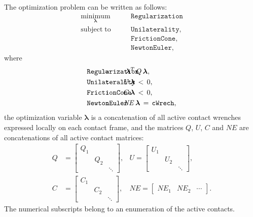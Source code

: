 \documentclass[12pt]{article}
\begin{document}
The optimization problem can be written as follows:
%
\begin{align}
    \underset{\bm{\lambda}}{\bm{\mathrm{minimum}}} &\qquad \texttt{Regularization}\\
    \bm{\mathrm{subject\;to}} &\qquad   \texttt{Unilaterality},      \nonumber\\
                  &\qquad  \texttt{FrictionCone},     \nonumber\\
                  & \qquad \texttt{NewtonEuler}, \nonumber
\end{align}
%
where
%
\begin{align}
    &\texttt{Regularization}& &\hspace{-20mm}\!\!\!=  \qquad\bm{\lambda}^T \,Q \,\bm{\lambda}, \\
    &\texttt{Unilaterality}& &\hspace{-20mm}\texttt{:}\qquad U\,\bm{\lambda} \,<\, 0, \\
    &\texttt{FrictionCone}& &\hspace{-20mm}\texttt{:}\qquad C\,\bm{\lambda} \,<\, 0, \\
    &\texttt{NewtonEuler} & &\hspace{-20mm}\texttt{:}\qquad \mathit{NE} \,\bm{\lambda} \,=\, \texttt{cWrech},
\end{align}
%
the optimization variable $\bm{\lambda}$ is a concatenation of all active contact wrenches expressed locally on each contact frame, and the matrices $Q$, $U$, $C$ and $\mathit{NE}$ are concatenations of all active contact matrices:
%
\begin{align}
    Q & = \begin{bmatrix}
        Q_1 & & \\
         & Q_2 & \\
         & & \ddots
    \end{bmatrix}, & U = \begin{bmatrix}
        U_1 & & \\
         & U_2 & \\
         & & \ddots
    \end{bmatrix}, \\
    C & = \begin{bmatrix}
        C_1 & & \\
         & C_2 & \\
         & & \ddots
    \end{bmatrix}, & \mathit{NE} = \begin{bmatrix}
        \mathit{NE}_1 & \mathit{NE}_2 & \cdots
    \end{bmatrix}.
\end{align}
%
The numerical subscripts belong to an enumeration of the active contacts.







\end{document}
